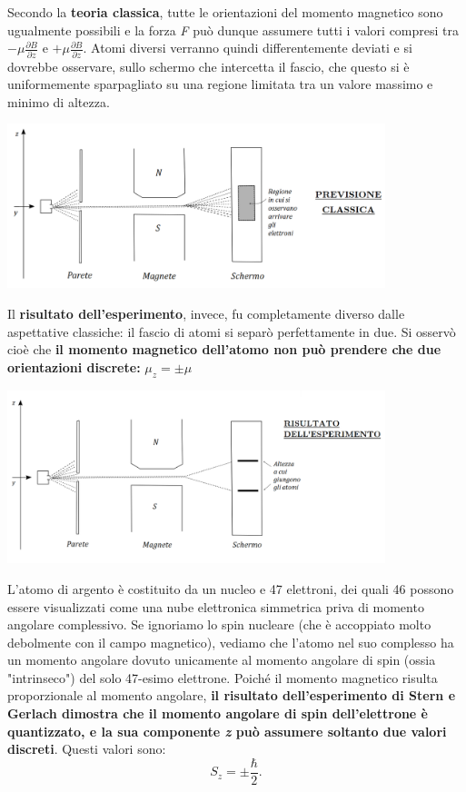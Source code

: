 Secondo la \textbf{teoria classica}, tutte le orientazioni del momento magnetico sono ugualmente possibili e la forza \emph{F} può dunque assumere tutti i valori compresi tra $-\mu \frac{\partial B}{\partial z}$ e $+\mu \frac{\partial B}{\partial z}$. Atomi diversi verranno quindi differentemente deviati e si dovrebbe osservare, sullo schermo che intercetta il fascio, che questo si è uniformemente sparpagliato su una regione limitata tra un valore massimo e minimo di altezza.
\begin{center}
\includegraphics[width=11cm]{immagini/cap_3/fig_3_1.png}
\end{center}

Il \textbf{risultato dell'esperimento}, invece, fu completamente diverso dalle aspettative classiche: il fascio di atomi si separò perfettamente in due. Si osservò cioè che \textbf{il momento magnetico dell'atomo non può prendere che due orientazioni discrete:} $\mu_z=\pm \mu $ \\
\begin{center}
\includegraphics[width=11cm]{immagini/cap_3/fig_3_2.png}
\end{center}

L'atomo di argento è costituito da un nucleo e 47 elettroni, dei quali 46 possono essere visualizzati come una nube elettronica simmetrica priva di momento angolare complessivo. Se ignoriamo lo spin nucleare (che è accoppiato molto debolmente con il campo magnetico), vediamo che l'atomo nel suo complesso ha un momento angolare dovuto unicamente al momento angolare di spin (ossia "intrinseco") del solo 47-esimo elettrone. Poiché il momento magnetico risulta proporzionale al momento angolare, \textbf{il risultato dell'esperimento di Stern e Gerlach dimostra che il momento angolare di spin dell'elettrone è quantizzato, e la sua componente \emph{z} può assumere soltanto due valori discreti}. Questi valori sono:
\begin{equation}
S_z= \pm \frac{\hbar}{2}.
\end{equation}
 
